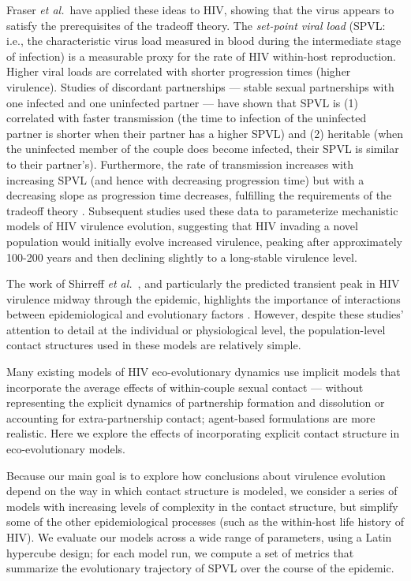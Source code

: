 \documentclass[10pt,letterpaper]{article}
\newcommand{\etal}{\textit{et al.}}
\begin{document}
Fraser \etal\ have applied these ideas to HIV,
showing that the virus appears to satisfy the prerequisites of
the tradeoff theory.
The \emph{set-point viral load} (SPVL: i.e., the
characteristic virus load measured in blood during the intermediate
stage of infection) is a measurable proxy for the rate of HIV within-host
reproduction. Higher viral loads are correlated with 
shorter progression times (higher virulence).
Studies of discordant partnerships --- stable
sexual partnerships with one infected and one uninfected partner --- %
have shown that SPVL is (1) correlated with faster transmission
(the time to infection of the uninfected partner is shorter when
their partner has a higher SPVL) and (2) heritable
(when the uninfected member of
the couple does become infected, their SPVL is similar to their
partner's).
Furthermore, the rate of transmission increases with
increasing SPVL (and hence with decreasing progression time)
but with a decreasing slope as progression time decreases,
fulfilling the requirements of the tradeoff theory
 \cite{Fraser+2007}.
Subsequent studies
\cite{shirreff_transmission_2011,herbeck_hiv_2014,herbeck_evolution_2016} used these data to
parameterize mechanistic models of HIV virulence evolution, suggesting
that HIV invading a novel population would initially evolve increased
virulence, peaking after approximately 100-200 years and then declining
slightly to a long-stable virulence level.

The work of Shirreff \etal\ \cite{shirreff_transmission_2011}, and particularly the predicted transient peak in HIV virulence midway through the epidemic,
highlights the importance of interactions between epidemiological and
evolutionary factors \cite{day_virulence_2004,alizon_price_2009}.
However, despite these studies' attention to detail at the individual
or physiological level, the population-level contact structures used in these
models are relatively simple.

Many existing models of HIV eco-evolutionary dynamics use implicit
models that incorporate the average effects of within-couple sexual
contact --- without representing the explicit dynamics of partnership
formation and dissolution or accounting for extra-partnership contact;
agent-based formulations are more realistic. Here we explore the
effects of incorporating explicit contact structure in
eco-evolutionary models.

Because our main goal is to explore how conclusions about virulence
evolution depend on the way in which contact structure
is modeled, we consider a series of
models with increasing levels of complexity in the contact
structure, but simplify some of the other epidemiological
processes (such as the within-host life history of HIV). 
We evaluate our models
across a wide range of parameters, using a Latin hypercube design; for
each model run, we compute a set of metrics 
that summarize the evolutionary trajectory of SPVL
over the course of the epidemic.
\end{document}
